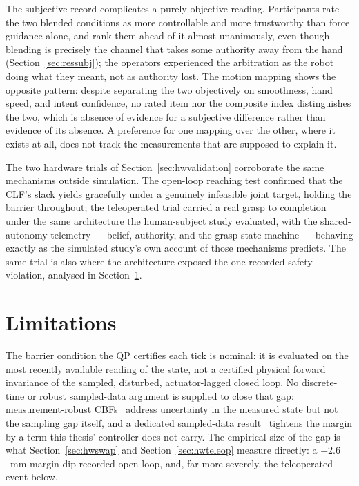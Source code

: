 \documentclass[12pt,a4paper,twoside,openright]{report}
\begin{document}
The subjective record complicates a purely objective reading. Participants rate the two blended conditions as more controllable and more trustworthy than force guidance alone, and rank them ahead of it almost unanimously, even though blending is precisely the channel that takes some authority away from the hand (Section~\ref{sec:ressubj}); the operators experienced the arbitration as the robot doing what they meant, not as authority lost. The motion mapping shows the opposite pattern: despite separating the two objectively on smoothness, hand speed, and intent confidence, no rated item nor the composite index distinguishes the two, which is absence of evidence for a subjective difference rather than evidence of its absence. A preference for one mapping over the other, where it exists at all, does not track the measurements that are supposed to explain it.

The two hardware trials of Section~\ref{sec:hwvalidation} corroborate the same mechanisms outside simulation. The open-loop reaching test confirmed that the CLF's slack yields gracefully under a genuinely infeasible joint target, holding the barrier throughout; the teleoperated trial carried a real grasp to completion under the same architecture the human-subject study evaluated, with the shared-autonomy telemetry --- belief, authority, and the grasp state machine --- behaving exactly as the simulated study's own account of those mechanisms predicts. The same trial is also where the architecture exposed the one recorded safety violation, analysed in Section~\ref{sec:concllimitations}.

\section{Limitations}
\label{sec:concllimitations}

The barrier condition the QP certifies each tick is nominal: it is evaluated on the most recently available reading of the state, not a certified physical forward invariance of the sampled, disturbed, actuator-lagged closed loop. No discrete-time or robust sampled-data argument is supplied to close that gap: measurement-robust CBFs~\cite{cosner2021mrcbf} address uncertainty in the measured state but not the sampling gap itself, and a dedicated sampled-data result~\cite{breeden2021sampled} tightens the margin by a term this thesis' controller does not carry. The empirical size of the gap is what Section~\ref{sec:hwswap} and Section~\ref{sec:hwteleop} measure directly: a $-2.6$~mm margin dip recorded open-loop, and, far more severely, the teleoperated event below.
\end{document}
